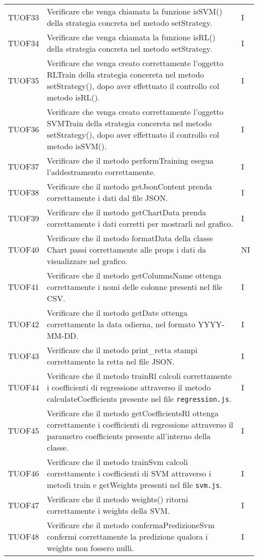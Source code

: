 \begin{longtable}{C{2cm} L{8cm} C{2cm}}
TUOF33 & Verificare che venga chiamata la funzione isSVM() della strategia concreta nel metodo setStrategy. & I \\
TUOF34 & Verificare che venga chiamata la funzione isRL() della strategia concreta nel metodo setStrategy. & I \\
TUOF35 & Verificare che venga creato correttamente l'oggetto RLTrain della strategia concereta nel metodo setStrategy(), dopo aver effettuato il controllo col metodo isRL(). & I \\
TUOF36 & Verificare che venga creato correttamente l'oggetto SVMTrain della strategia concereta nel metodo setStrategy(), dopo aver effettuato il controllo col metodo isSVM(). & I \\
TUOF37 & Verificare che il metodo performTraining esegua l'addestramento correttamente. & I \\
TUOF38 & Verificare che il metodo getJsonContent prenda correttamente i dati dal file JSON. & I \\
TUOF39 & Verificare che il metodo getChartData prenda correttamente i dati corretti per mostrarli nel grafico. & I \\
TUOF40 & Verificare che il metodo formatData della classe Chart passi correttamente alle props i dati da visualizzare nel grafico. & NI \\
TUOF41 & Verificare che il metodo getColumnsName ottenga correttamente i nomi delle colonne presenti nel file CSV. & I \\
TUOF42 & Verificare che il metodo getDate ottenga correttamente la data odierna, nel formato YYYY-MM-DD. & I \\
TUOF43 & Verificare che il metodo print\_retta stampi correttamente la retta nel file JSON. & I \\
TUOF44 & Verificare che il metodo trainRl calcoli correttamente i coefficienti di regressione attraverso il metodo calculateCoefficients presente nel file \texttt{regression.js}. & I \\
TUOF45 & Verificare che il metodo getCoefficientsRl ottenga correttamente i coefficienti di regressione attraverso il parametro coefficients presente all'interno della classe. & I \\
TUOF46 & Verificare che il metodo trainSvm calcoli correttamente i coefficienti di SVM attraverso i metodi train e getWeights presenti nel file \texttt{svm.js}. & I \\
TUOF47 & Verificare che il metodo weights() ritorni correttamente i weights della SVM. & I \\
TUOF48 & Verificare che il metodo confermaPredizioneSvm confermi correttamente la predizione qualora i weights non fossero nulli. & I \\


\end{longtable}
